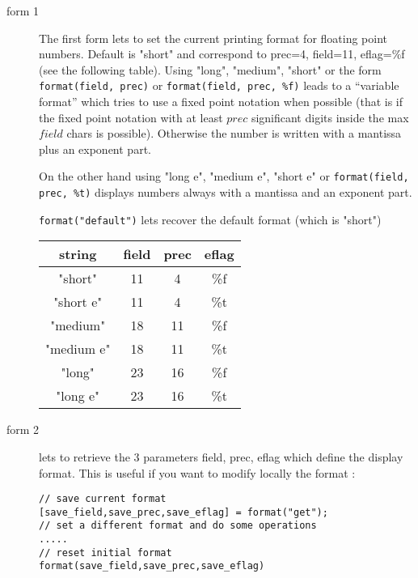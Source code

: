   \begin{mandescription}
  \begin{description}
  \item[form 1]  The first form lets to set the current printing format for floating point
    numbers. Default is "short" and correspond to prec=4, field=11, eflag=\%f (see the following
    table). Using  "long", "medium", "short" or the form \verb+format(field, prec)+
    or \verb+format(field, prec, %f)+ leads to a ``variable format'' 
    which tries to use a fixed point notation when possible (that
    is if the fixed point notation with at least $prec$ significant digits
    inside the max $field$ chars is possible). Otherwise the number is
    written with a mantissa plus an exponent part.

    On the other hand using  "long e", "medium e", "short e" or
     \verb+format(field, prec, %t)+  displays numbers always
    with a mantissa and an exponent part.

    \verb+format("default")+ lets recover the default format (which is "short")

  \begin{tabular}{|c|c|c|c|}
     string  & field & prec & eflag \\
  \hline
   "short"   & 11    & 4    &  \%f \\
   "short e" & 11    & 4    &  \%t \\
   "medium"  & 18    & 11   &  \%f \\
   "medium e"& 18    & 11   &  \%t \\
   "long"    & 23    & 16   &  \%f \\
   "long e"  & 23    & 16   &  \%t \\
   \end{tabular}

  \item[form 2] lets to retrieve the 3 parameters field, prec, eflag which define the display format.
      This is useful if you want to modify locally the format :
\begin{Verbatim}
// save current format
[save_field,save_prec,save_eflag] = format("get");
// set a different format and do some operations
.....
// reset initial format
format(save_field,save_prec,save_eflag)
\end{Verbatim}
      
  \end{description} 
    
  \end{mandescription}

